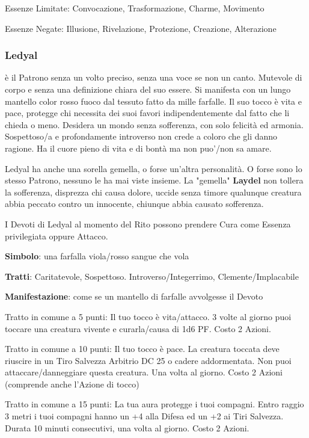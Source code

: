 \documentclass[a4paper,11pt,twoside,openany]{book}
\begin{document}
Essenze Limitate: Convocazione, Trasformazione, Charme, Movimento

Essenze Negate: Illusione, Rivelazione, Protezione, Creazione, Alterazione

\subsubsection{Ledyal}

\label{ledyal}

è il Patrono senza un volto preciso, senza una voce se non un canto. Mutevole di corpo e senza una definizione chiara del suo essere. Si manifesta con un lungo mantello color rosso fuoco dal tessuto fatto da mille farfalle. Il suo tocco è vita e pace, protegge chi necessita dei suoi favori indipendentemente dal fatto che li chieda o meno. Desidera un mondo senza sofferenza, con solo felicità ed armonia. Sospettoso/a e profondamente introverso non crede a coloro che gli danno ragione. Ha il cuore pieno di vita e di bontà ma non puo'/non sa amare.

Ledyal ha anche una sorella gemella, o forse un'altra personalità. O forse sono lo stesso Patrono, nessuno le ha mai viste insieme. La "gemella" \textbf{Laydel} non tollera la sofferenza, disprezza chi causa dolore, uccide senza timore qualunque creatura abbia peccato contro un innocente, chiunque abbia causato sofferenza.

I Devoti di Ledyal al momento del Rito possono prendere Cura come Essenza privilegiata oppure Attacco.

\textbf{Simbolo}: una farfalla viola/rosso sangue che vola

\textbf{Tratti}: Caritatevole, Sospettoso. Introverso/Integerrimo, Clemente/Implacabile

\textbf{Manifestazione}: come se un mantello di farfalle avvolgesse il Devoto

\bigskip

Tratto in comune a 5 punti: Il tuo tocco è vita/attacco. 3 volte al giorno puoi toccare una creatura vivente e curarla/causa di 1d6 PF. Costo 2 Azioni.

Tratto in comune a 10 punti: Il tuo tocco è pace. La creatura toccata deve riuscire in un Tiro Salvezza Arbitrio DC 25 o cadere addormentata. Non puoi attaccare/danneggiare questa creatura. Una volta al giorno. Costo 2 Azioni (comprende anche l'Azione di tocco)

Tratto in comune a 15 punti: La tua aura protegge i tuoi compagni. Entro raggio 3 metri i tuoi compagni hanno un +4 alla Difesa ed un +2 ai Tiri Salvezza. Durata 10 minuti consecutivi, una volta al giorno. Costo 2 Azioni.
\end{document}
